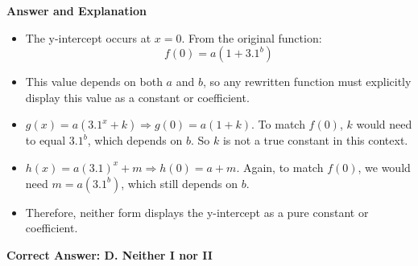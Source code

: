 \documentclass{beamer}
\begin{document}
\begin{frame}{\textbf{Answer and Explanation}}
\begin{itemize}
    \item The y-intercept occurs at \( x = 0 \). From the original function:
    \[
    f(0) = a(1 + 3.1^b)
    \]
    \item This value depends on both \( a \) and \( b \), so any rewritten function must explicitly display this value as a constant or coefficient.
    
    \item[I.] \( g(x) = a(3.1^x + k) \Rightarrow g(0) = a(1 + k) \). To match \( f(0) \), \( k \) would need to equal \( 3.1^b \), which depends on \( b \). So \( k \) is not a true constant in this context.
    
    \item[II.] \( h(x) = a(3.1)^x + m \Rightarrow h(0) = a + m \). Again, to match \( f(0) \), we would need \( m = a(3.1^b) \), which still depends on \( b \).

    \item Therefore, neither form displays the y-intercept as a pure constant or coefficient.
\end{itemize}

\textbf{Correct Answer: D. Neither I nor II}
\end{frame}
\end{document}
